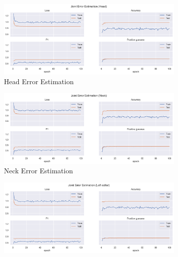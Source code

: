 \begin{figure}[!ht]
    \centering
    \begin{subfigure}[b]{0.47\linewidth}
        \centering
        \includegraphics[width=\textwidth]{figures/Results/v2_bs_40_is_64_e_100/jt/Head_ErrorEstimation.png}
        \caption{Head Error Estimation}
        \label{fig:v2_head_jt_ee}
    \end{subfigure}
    \hfill
    \begin{subfigure}[b]{0.47\linewidth}
        \centering
        \includegraphics[width=\textwidth]{figures/Results/v2_bs_40_is_64_e_100/jt/Neck_ErrorEstimation.png}
        \caption{Neck Error Estimation}
        \label{fig:v2_neck_jt_ee}
    \end{subfigure}
    \hfill
    \begin{subfigure}[b]{0.47\linewidth}
        \centering
        \includegraphics[width=\textwidth]{figures/Results/v2_bs_40_is_64_e_100/jt/Left collar_ErrorEstimation.png}

\end{subfigure}
\end{figure}
